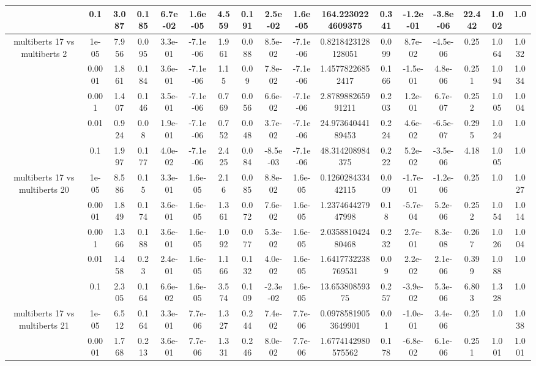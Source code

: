 \begin{tabular}{|c|c|c|c|c|c|c|c|c|c|c|c|c|c|c|c|c|}
 & 0.1 & 3.087 & 0.185 & 6.7e-02 & 1.6e-05 & 4.559 & 0.191 & 2.5e-02 & 1.6e-05 & 164.2230224609375 & 0.341 & -1.2e-01 & -3.8e-06 & 22.442 & 1.002 & 1.0 \\
\hline
\multirow{5}{*}{multiberts 17 vs multiberts 2} & 1e-05 & 7.956 & 0.095 & 3.3e-01 & -7.1e-06 & 1.961 & 0.088 & 8.5e-02 & -7.1e-06 & 0.8218423128128051 & 0.099 & 8.7e-02 & -4.5e-06 & 0.25 & 1.064 & 1.032 \\
 & 0.0001 & 1.861 & 0.184 & 3.6e-01 & -7.1e-06 & 1.15 & 0.09 & 7.8e-02 & -7.1e-06 & 1.45778226852417 & 0.166 & -1.5e-01 & 4.8e-06 & 0.251 & 1.094 & 1.034 \\
 & 0.001 & 1.407 & 0.146 & 3.5e-01 & -7.1e-06 & 0.769 & 0.056 & 6.6e-02 & -7.1e-06 & 2.878988265991211 & 0.203 & 1.2e-01 & 6.7e-07 & 0.252 & 1.005 & 1.004 \\
 & 0.01 & 0.924 & 0.08 & 1.9e-01 & -7.1e-06 & 0.752 & 0.048 & 3.7e-02 & -7.1e-06 & 24.97364044189453 & 0.224 & 4.6e-02 & -6.5e-07 & 0.295 & 1.024 & 1.0 \\
 & 0.1 & 1.997 & 0.177 & 4.0e-02 & -7.1e-06 & 2.425 & 0.084 & -8.5e-03 & -7.1e-06 & 48.314208984375 & 0.222 & 5.2e-02 & -3.5e-06 & 4.18 & 1.005 & 1.0 \\
\hline
\multirow{5}{*}{multiberts 17 vs multiberts 20} & 1e-05 & 8.586 & 0.15 & 3.3e-01 & 1.6e-05 & 2.16 & 0.085 & 8.8e-02 & 1.6e-05 & 0.126028433442115 & 0.009 & -1.7e-01 & -1.2e-06 & 0.25 & 1.0 & 1.027 \\
 & 0.0001 & 1.849 & 0.174 & 3.6e-01 & 1.6e-05 & 1.361 & 0.072 & 7.6e-02 & 1.6e-05 & 1.237464427947998 & 0.18 & -5.7e-04 & 5.2e-06 & 0.252 & 1.054 & 1.014 \\
 & 0.001 & 1.366 & 0.188 & 3.6e-01 & 1.6e-05 & 1.092 & 0.077 & 5.3e-02 & 1.6e-05 & 2.035881042480468 & 0.232 & 2.7e-01 & 8.3e-08 & 0.267 & 1.026 & 1.004 \\
 & 0.01 & 1.458 & 0.23 & 2.4e-01 & 1.6e-05 & 1.166 & 0.132 & 4.0e-02 & 1.6e-05 & 1.6417732238769531 & 0.09 & 2.2e-02 & 2.1e-06 & 0.399 & 1.088 & 1.0 \\
 & 0.1 & 2.305 & 0.164 & 6.6e-02 & 1.6e-05 & 3.574 & 0.109 & -2.3e-02 & 1.6e-05 & 13.65380859375 & 0.257 & -3.9e-02 & 5.3e-06 & 6.803 & 1.328 & 1.0 \\
\hline
\multirow{5}{*}{multiberts 17 vs multiberts 21} & 1e-05 & 6.512 & 0.164 & 3.3e-01 & 7.7e-06 & 1.327 & 0.244 & 7.4e-02 & 7.7e-06 & 0.09785819053649901 & 0.01 & -1.0e-01 & 3.4e-06 & 0.25 & 1.0 & 1.038 \\
 & 0.0001 & 1.768 & 0.213 & 3.6e-01 & 7.7e-06 & 1.331 & 0.246 & 8.0e-02 & 7.7e-06 & 1.6774142980575562 & 0.178 & -6.8e-02 & 6.1e-06 & 0.251 & 1.001 & 1.001 \\

\end{tabular}
